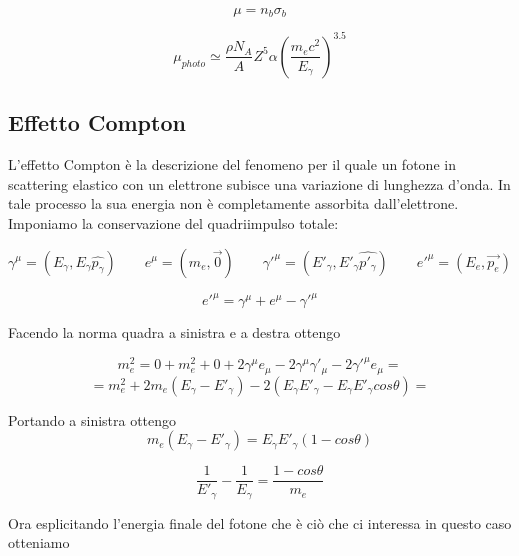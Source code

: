 \begin{equation}
\mu=n_{b}\sigma_{b} 
\end{equation}

\begin{equation}
\mu_{photo}\simeq\frac{\rho N_{A}}{A}Z^5\alpha(\frac{m_{e}c^2}{E_{\gamma}})^{3.5}
\end{equation}

\subsection{Effetto Compton}

L'effetto Compton è la descrizione del fenomeno per il quale un fotone in scattering elastico con un elettrone subisce una variazione di lunghezza d'onda. In tale processo la sua energia non è completamente assorbita dall'elettrone. Imponiamo la conservazione del quadriimpulso totale:

\begin{equation}
\gamma^{\mu}=(E_{\gamma},E_{\gamma}\hat{p_{\gamma}})\qquad e^{\mu}=(m_e,\vec{0}) \qquad \gamma'^{\mu}=(E'_{\gamma},E'_{\gamma}\hat{p'_{\gamma}}) \qquad e'^{\mu}=(E_e,\vec{p_e})
\end{equation}

\begin{equation}
e'^{\mu}=\gamma^{\mu}+e^{\mu}-\gamma'^{\mu}
\end{equation}

Facendo la norma quadra a sinistra e a destra ottengo

\begin{equation}
m_e^2=0+m_e^2+0+2\gamma^{\mu}e_{\mu}-2\gamma^{\mu}\gamma'_{\mu}-2\gamma'^{\mu}e_{\mu}=
\end{equation}
\begin{equation}
=m_e^2+2m_e(E_{\gamma}-E'_{\gamma})-2(E_{\gamma}E'_{\gamma}-E_{\gamma}E'_{\gamma}cos\theta)=
\end{equation}

Portando a sinistra ottengo
\begin{equation}
m_e(E_{\gamma}-E'_{\gamma})=E_{\gamma}E'_{\gamma}(1-cos\theta)
\end{equation}

\begin{equation}
\frac{1}{E'_{\gamma}}-\frac{1}{E_{\gamma}}=\frac{1-cos\theta}{m_e}
\end{equation}

Ora esplicitando l'energia finale del fotone che è ciò che ci interessa in questo caso otteniamo

